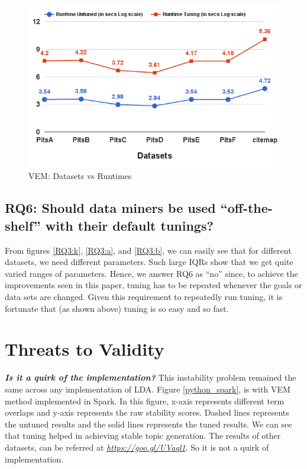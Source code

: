 \documentclass[conference]{IEEEtran}
\theoremstyle{break}
\begin{document}
\begin{center}
\begin{figure}[!h]
  \includegraphics[width=\linewidth]{./fig/Run_VEM_sci.png}
  \caption{VEM: Datasets vs Runtimes}
  \label{RQ5 VEM}
\end{figure}
\end{center}

\subsection{\textbf{RQ6: Should data miners be used “off-the-shelf” with their  default  tunings?}}

From figures \ref{RQ3:k}, \ref{RQ3:a}, and \ref{RQ3:b}, we can easily see that for different datasets, we need different parameters. Such large IQRs show that we get quite varied ranges of parameters. Hence, we answer RQ6 as “no” since, to achieve the improvements seen in this paper, tuning has to be repeated whenever the goals or data sets are changed. Given this requirement to repeatedly run tuning, it is fortunate that (as shown above) tuning is so easy and so fast.

\section{Threats to Validity}
\label{sect: validity}

\textit{\textbf{Is it a quirk of the implementation?}} This instability problem remained the same across any implementation of LDA. Figure \ref{python_spark}, is with VEM method implemented in Spark. In this figure, x-axis represents different term overlaps and y-axis represents the raw stability scores. Dashed lines represents the untuned results and the solid lines represents the tuned results. We can see that tuning helped in achieving stable topic generation. The results of other datasets, can be referred at \href{https://goo.gl/UVaql1}{\textit{https://goo.gl/UVaql1}}. So it is not a quirk of implementation.
\end{document}

